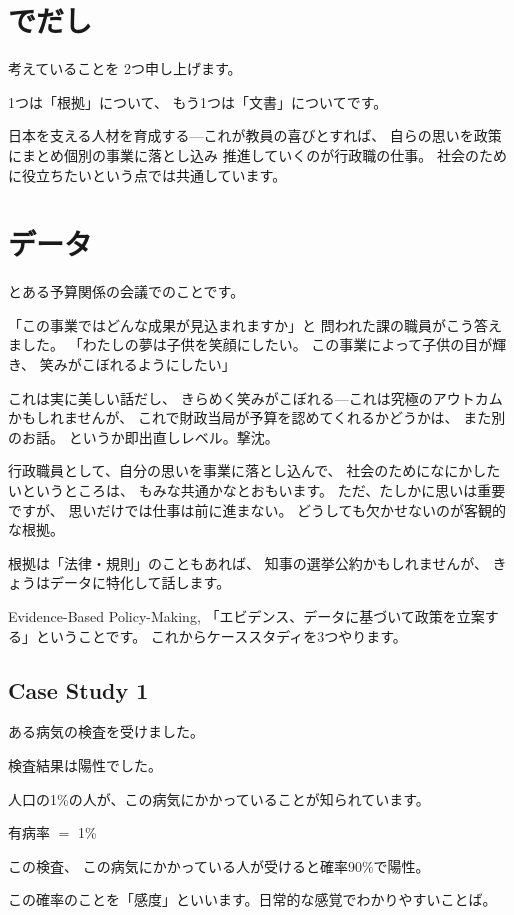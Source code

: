 \documentclass[uplatex,jis2004,dvipdfmx,12pt]{jsarticle}
\begin{document}
\section{でだし}
考えていることを
2つ申し上げます。

1つは「根拠」について、
もう1つは「文書」についてです。


日本を支える人材を育成する---これが教員の喜びとすれば、
自らの思いを政策にまとめ個別の事業に落とし込み
推進していくのが行政職の仕事。
社会のために役立ちたいという点では共通しています。


\section{データ}
とある予算関係の会議でのことです。

「この事業ではどんな成果が見込まれますか」と
問われた課の職員がこう答えました。
「わたしの夢は子供を笑顔にしたい。
この事業によって子供の目が輝き、
笑みがこぼれるようにしたい」

これは実に美しい話だし、
きらめく笑みがこぼれる---これは究極のアウトカムかもしれませんが、
これで財政当局が予算を認めてくれるかどうかは、
また別のお話。
というか即出直しレベル。撃沈。




行政職員として、自分の思いを事業に落とし込んで、
社会のためになにかしたいというところは、
もみな共通かなとおもいます。
ただ、たしかに思いは重要ですが、
思いだけでは仕事は前に進まない。
どうしても欠かせないのが客観的な根拠。



根拠は「法律・規則」のこともあれば、
知事の選挙公約かもしれませんが、
きょうはデータに特化して話します。


Evidence-Based Policy-Making,
「エビデンス、データに基づいて政策を立案する」ということです。
これからケーススタディを3つやります。

\subsection{Case Study 1}

ある病気の検査を受けました。

検査結果は陽性でした。

人口の1\%の人が、この病気にかかっていることが知られています。

有病率 $=$ 1\%

この検査、
この病気にかかっている人が受けると確率90\%で陽性。

この確率のことを「感度」といいます。日常的な感覚でわかりやすいことば。
\end{document}
